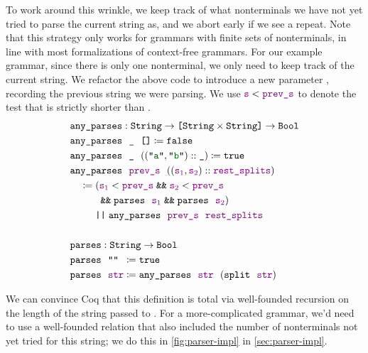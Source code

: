     To work around this wrinkle, we keep track of what nonterminals we have not yet tried to parse the current string as, and we abort early if we see a repeat.  Note that this strategy only works for grammars with finite sets of nonterminals, in line with most formalizations of context-free grammars.  For our example grammar, since there is only one nonterminal, we only need to keep track of the current string.  We refactor the above code to introduce a new parameter , recording the previous string we were parsing.  We use $\textcolor{violet}{\texttt{s}} < \textcolor{violet}{\texttt{prev\_s}}$ to denote the test that  is strictly shorter than . \label{sec:valid-param-parser}
    \begin{align*}
      & \fname{any\_parses} \oftypesep \String \typeto \typelistp{\typeprod{\String}{\String}} \typeto \Bool \\
      & \fname{any\_parses}~~\termhole~~\nil \defeq \false \\
      & \fname{any\_parses}~~\termhole~~(\cons{(\str{a}, \str{b})}{\termhole}) \defeq \true \\
      & \fname{any\_parses}~~\farg{prev\_s}~~(\cons{(\farg{s$_1$}, \farg{s$_2$})}{\farg{rest\_splits}}) \\
      & \quad \defeq \left( \farg{s$_1$} < \farg{prev\_s} \booland \farg{s$_2$} < \farg{prev\_s} \right. \\
      & \phantom{\quad \defeq \left(\right.} \left.\booland \fname{parses}~~\farg{s$_1$} \booland \fname{parses}~~\farg{s$_2$}\right) \\
      & \phantom{\quad \defeq {}} \boolor \fname{any\_parses}~~\farg{prev\_s}~~\farg{rest\_splits} \\
      \\
      & \fname{parses} \oftypesep \String \typeto \Bool \\
      & \fname{parses}~~\aswidthof{\str{}}{\farg{str}} \defeq \true \\
      & \fname{parses}~~\farg{str} \defeq \fname{any\_parses}~~\farg{str}~~(\fname{split}~~\farg{str})
    \end{align*}

    We can convince Coq that this definition is total via well-founded recursion on the length of the string passed to .  For a more-complicated grammar, we'd need to use a well-founded relation that also included the number of nonterminals not yet tried for this string; we do this in \autoref{fig:parser-impl} in \autoref{sec:parser-impl}.


